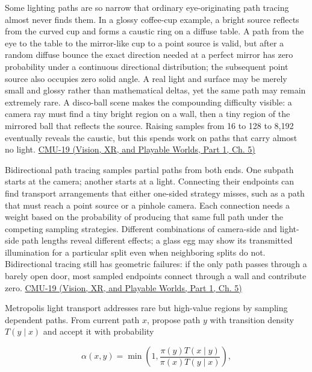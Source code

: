 Some lighting paths are so narrow that ordinary eye-originating path tracing almost never finds them. In a glossy coffee-cup example, a bright source reflects from the curved cup and forms a caustic ring on a diffuse table. A path from the eye to the table to the mirror-like cup to a point source is valid, but after a random diffuse bounce the exact direction needed at a perfect mirror has zero probability under a continuous directional distribution; the subsequent point source also occupies zero solid angle. A real light and surface may be merely small and glossy rather than mathematical deltas, yet the same path may remain extremely rare. A disco-ball scene makes the compounding difficulty visible: a camera ray must find a tiny bright region on a wall, then a tiny region of the mirrored ball that reflects the source. Raising samples from 16 to 128 to 8,192 eventually reveals the caustic, but this spends work on paths that carry almost no light. \href{../07-Vision-XR-and-Playable-Worlds-P01/main.pdf\#04-visual-computing-ii-ch036-cmu-19---variance-reduction}{CMU-19 (Vision, XR, and Playable Worlds, Part 1, Ch. 5)}

Bidirectional path tracing samples partial paths from both ends. One subpath starts at the camera; another starts at a light. Connecting their endpoints can find transport arrangements that either one-sided strategy misses, such as a path that must reach a point source or a pinhole camera. Each connection needs a weight based on the probability of producing that same full path under the competing sampling strategies. Different combinations of camera-side and light-side path lengths reveal different effects; a glass egg may show its transmitted illumination for a particular split even when neighboring splits do not. Bidirectional tracing still has geometric failures: if the only path passes through a barely open door, most sampled endpoints connect through a wall and contribute zero. \href{../07-Vision-XR-and-Playable-Worlds-P01/main.pdf\#04-visual-computing-ii-ch036-cmu-19---variance-reduction}{CMU-19 (Vision, XR, and Playable Worlds, Part 1, Ch. 5)}

Metropolis light transport addresses rare but high-value regions by sampling dependent paths. From current path \(x\), propose path \(y\) with transition density \(T(y\mid x)\) and accept it with probability

\[
\alpha(x,y)=\min\!\left(1,\frac{\pi(y)T(x\mid y)}{\pi(x)T(y\mid x)}\right),
\]

